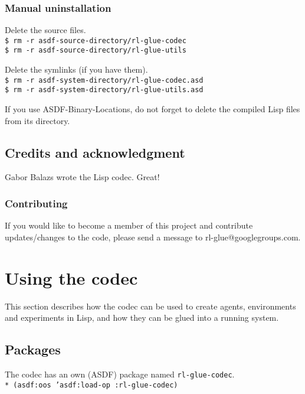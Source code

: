 \documentclass[11pt,a4paper,dvipdfm]{article}
\newcommand{\prompttext}[1]{\texttt{#1}}
\newcommand{\shprompt}[1]{\prompttext{\$ #1}}
\newcommand{\lispprompt}[1]{\prompttext{* #1}}
\begin{document}
\subsubsection{Manual uninstallation}

Delete the source files. \\
\shprompt{rm -r asdf-source-directory/rl-glue-codec} \\
\shprompt{rm -r asdf-source-directory/rl-glue-utils}

Delete the symlinks (if you have them). \\
\shprompt{rm -r asdf-system-directory/rl-glue-codec.asd} \\
\shprompt{rm -r asdf-system-directory/rl-glue-utils.asd}

If you use ASDF-Binary-Locations, do not forget to delete the compiled
Lisp files from its directory.

\subsection{Credits and acknowledgment}

Gabor Balazs wrote the Lisp codec. Great!

\subsubsection{Contributing}

If you would like to become a member of this project and contribute 
updates/changes to the code, please send a message to rl-glue@googlegroups.com.


\section{Using the codec}

This section describes how the codec can be used to create agents, environments
and experiments in Lisp, and how they can be glued into a running system.

\subsection{Packages}

The codec has an own (ASDF) package named \prompttext{rl-glue-codec}. \\
\lispprompt{(asdf:oos 'asdf:load-op :rl-glue-codec)}
\end{document}

